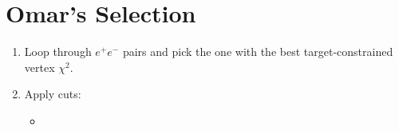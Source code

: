 \documentclass[twoside]{article}
\begin{document}
\section{Omar's Selection}

\begin{enumerate}
    \item Loop through $e^+e^-$ pairs and pick the one with the best target-constrained vertex $\chi^2$.
    \item Apply cuts:
        \begin{itemize}
            \item 
        \end{itemize}
\end{enumerate}


%






\end{document}
